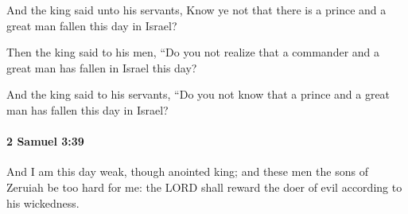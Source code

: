 			\begin{versebox}
					\item[BHS] 
					\item[ASV] And the king said unto his servants, Know ye not that there is a prince and a great man fallen this day in Israel?
					\item[NIV] Then the king said to his men, “Do you not realize that a commander and a great man has fallen in Israel this day?
					\item[NRSV] And the king said to his servants, “Do you not know that a prince and a great man has fallen this day in Israel?
			\end{versebox}

		\paragraph{2 Samuel 3:39} %
			\label{2SAMUEL-3-39}

			And I am this day weak, though anointed king; and these men the sons of Zeruiah be too hard for me: the LORD shall reward the doer of evil according to his wickedness.

